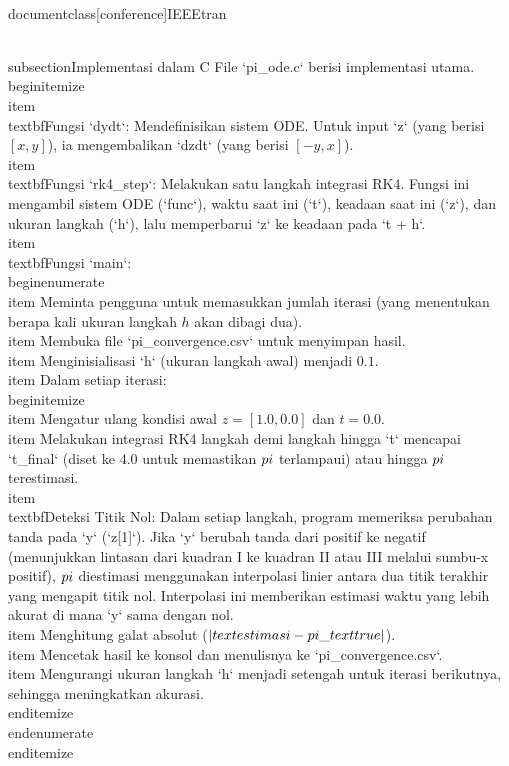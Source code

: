 \\documentclass[conference]{IEEEtran}
\begin{document}
\\subsection{Implementasi dalam C}
File `pi_ode.c` berisi implementasi utama.
\\begin{itemize}
\\item \\textbf{Fungsi `dydt`}: Mendefinisikan sistem ODE. Untuk input `z` (yang berisi $[x, y]$), ia mengembalikan `dzdt` (yang berisi $[-y, x]$).
\\item \\textbf{Fungsi `rk4_step`}: Melakukan satu langkah integrasi RK4. Fungsi ini mengambil sistem ODE (`func`), waktu saat ini (`t`), keadaan saat ini (`z`), dan ukuran langkah (`h`), lalu memperbarui `z` ke keadaan pada `t + h`.
\\item \\textbf{Fungsi `main`}:
\\begin{enumerate}
\\item Meminta pengguna untuk memasukkan jumlah iterasi (yang menentukan berapa kali ukuran langkah $h$ akan dibagi dua).
\\item Membuka file `pi_convergence.csv` untuk menyimpan hasil.
\\item Menginisialisasi `h` (ukuran langkah awal) menjadi $0.1$.
\\item Dalam setiap iterasi:
\\begin{itemize}
\\item Mengatur ulang kondisi awal $z = [1.0, 0.0]$ dan $t = 0.0$.
\\item Melakukan integrasi RK4 langkah demi langkah hingga `t` mencapai `t_final` (diset ke $4.0$ untuk memastikan $\\pi$ terlampaui) atau hingga $\\pi$ terestimasi.
\\item \\textbf{Deteksi Titik Nol}: Dalam setiap langkah, program memeriksa perubahan tanda pada `y` (`z[1]`). Jika `y` berubah tanda dari positif ke negatif (menunjukkan lintasan dari kuadran I ke kuadran II atau III melalui sumbu-x positif), $\\pi$ diestimasi menggunakan interpolasi linier antara dua titik terakhir yang mengapit titik nol. Interpolasi ini memberikan estimasi waktu yang lebih akurat di mana `y` sama dengan nol.
\\item Menghitung galat absolut ($|\\text{estimasi} - \\pi\_{\\text{true}}|$).
\\item Mencetak hasil ke konsol dan menulisnya ke `pi_convergence.csv`.
\\item Mengurangi ukuran langkah `h` menjadi setengah untuk iterasi berikutnya, sehingga meningkatkan akurasi.
\\end{itemize}
\\end{enumerate}
\\end{itemize}
\end{document}
